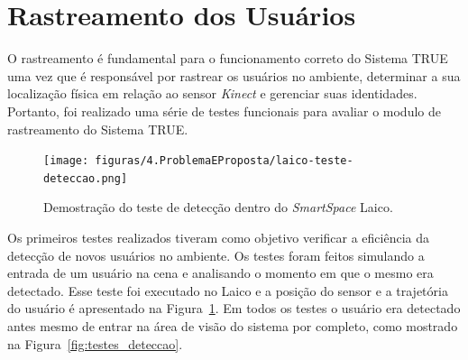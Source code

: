 \section{Rastreamento dos Usuários}

	O rastreamento é fundamental para o funcionamento correto do Sistema TRUE uma
	vez que é responsável por rastrear os usuários no ambiente, determinar a sua localização
	física em relação ao sensor \textit{Kinect} e gerenciar suas identidades.
	Portanto, foi realizado uma série de testes funcionais para avaliar o modulo de
	rastreamento do Sistema TRUE.
		
	\begin{figure}[htb]
		\begin{center}
 			\texttt{[image: figuras/4.ProblemaEProposta/laico-teste-deteccao.png]}
 		\end{center}
 		\caption{Demostração do teste de detecção dentro do \textit{SmartSpace}
 		Laico.}
		\label{fig:laico-teste-deteccao}
	\end{figure}		
	
	Os primeiros testes realizados tiveram como objetivo verificar a eficiência da
	detecção de novos usuários no ambiente. Os testes foram feitos simulando a
	entrada de um usuário na cena e analisando o momento em que o mesmo era
	detectado. Esse teste foi executado no Laico e a posição do sensor e a
	trajetória do usuário é apresentado na Figura~\ref{fig:laico-teste-deteccao}. Em
	todos os testes o usuário era detectado antes mesmo de entrar na área de visão
	do sistema por completo, como mostrado na Figura~\ref{fig:testes_deteccao}.
	
